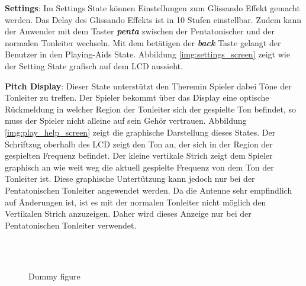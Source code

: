 \textbf{Settings}:
Im Settings State können Einstellungen zum Glissando Effekt gemacht werden. Das Delay des Glissando Effekts ist in 10 Stufen einstellbar. Zudem kann der Anwender mit dem Taster \textbf{\textit{penta}} zwischen der Pentatonischer und der normalen Tonleiter wechseln. Mit dem betätigen der \textbf{\textit{back}} Taste gelangt der Benutzer in den Playing-Aids State. Abbildung \ref{img:settings_screen} zeigt wie der Setting State grafisch auf dem LCD aussieht.

\textbf{Pitch Display}:
Dieser State unterstützt den Theremin Spieler dabei Töne der Tonleiter zu treffen. Der Spieler bekommt über das Display eine optische Rückmeldung in welcher Region der Tonleiter sich der gespielte Ton befindet, so muss der Spieler nicht alleine auf sein Gehör vertrauen.
Abbildung \ref{img:play_help_screen} zeigt die graphische Darstellung dieses States.  
Der Schriftzug oberhalb des LCD zeigt den Ton an, der sich in der Region der gespielten Frequenz befindet. 
Der kleine vertikale Strich zeigt dem Spieler graphisch an wie weit weg die aktuell gespielte Frequenz von dem Ton der Tonleiter ist. 
Diese graphische Untertützung kann jedoch nur bei der Pentatonischen Tonleiter angewendet werden.  Da die Antenne sehr empfindlich auf Änderungen ist, ist es mit der normalen Tonleiter nicht möglich den Vertikalen Strich anzuzeigen. Daher wird dieses Anzeige nur bei der Pentatonischen Tonleiter verwendet.

\begin{figure}[!ht]
	\hfill
	\hfill
	\\
	\hfill
	\hfill
	\\
	\hfill

	\caption{Dummy figure}
	\label{fig:dummy}
\end{figure}
